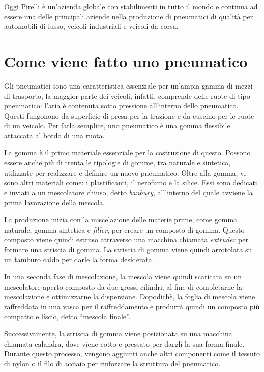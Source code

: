 Oggi Pirelli è un'azienda globale con stabilimenti in tutto il mondo e continua ad essere una delle principali aziende nella produzione di pneumatici di qualità per automobili di lusso, veicoli industriali e veicoli da corsa.
\cite{WikipediaPirelli}
\cite{PirelliHist}

\label{Processo di produzione di uno pneumatico}
\section{Come viene fatto uno pneumatico}

Gli pneumatici sono una caratteristica essenziale per un'ampia gamma di mezzi di trasporto,
la maggior parte dei veicoli, infatti, comprende delle ruote di tipo pneumatico: l'aria è contenuta sotto pressione all'interno dello pneumatico. 
Questi fungonono da superficie di presa per la trazione e da cuscino per le ruote di un veicolo.
Per farla semplice, uno pneumatico è una gomma flessibile attaccata al bordo di una ruota. 

La gomma è il primo materiale essenziale per la costruzione di questo. 
Possono essere anche più di trenta le tipologie di gomme, tra naturale e sintetica, utilizzate per realizzare e definire un nuovo pneumatico.
Oltre alla gomma, vi sono altri materiali come: i plastificanti, il nerofumo e la silice.
Essi sono dedicati e inviati a un mescolatore chiuso, detto \textit{banbury}, all'interno del quale avviene la prima lavorazione della mescola.

La produzione inizia con la miscelazione delle materie prime, come gomma naturale, gomma sintetica e \textit{filler}, per creare un composto di gomma. Questo composto viene quindi estruso attraverso una macchina chiamata \textit{extruder} per formare una striscia di gomma. La striscia di gomma viene quindi arrotolata su un tamburo caldo per darle la forma desiderata.

In una seconda fase di mescolazione, la mescola viene quindi scaricata su un mescolatore aperto composto da due grossi cilindri, al fine di completarne la mescolazione e ottimizzarne la dispersione. 
Dopodichè, la foglia di mescola viene raffreddata in una vasca per il raffreddamento e produrrà quindi un composto più compatto e liscio, detto ``mescola finale''.

Successivamente, la striscia di gomma viene posizionata su una macchina chiamata calandra, dove viene cotto e pressato per dargli la sua forma finale. 
Durante questo processo, vengono aggiunti anche altri componenti come il tessuto di nylon o il filo di acciaio per rinforzare la struttura del pneumatico.
\cite{PirelliComefatto}
\cite{Madehow}

